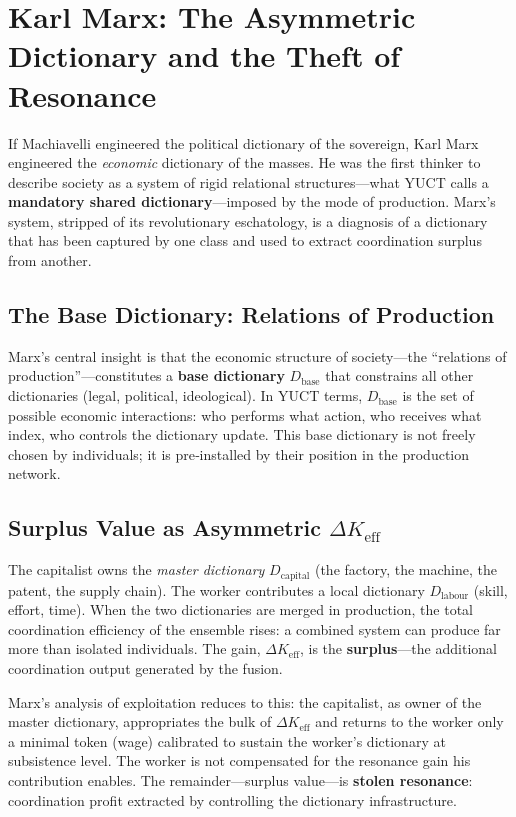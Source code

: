 \documentclass[12pt,a4paper]{article}
\newcommand{\Keff}{K_{\mathrm{eff}}}
\begin{document}
	\section{Karl Marx: The Asymmetric Dictionary and the Theft of Resonance}
	\label{sec:marx}
	
	If Machiavelli engineered the political dictionary of the sovereign, Karl Marx engineered the \emph{economic} dictionary of the masses. He was the first thinker to describe society as a system of rigid relational structures—what YUCT calls a \textbf{mandatory shared dictionary}—imposed by the mode of production. Marx’s system, stripped of its revolutionary eschatology, is a diagnosis of a dictionary that has been captured by one class and used to extract coordination surplus from another.
	
	\subsection{The Base Dictionary: Relations of Production}
	
	Marx’s central insight is that the economic structure of society—the ``relations of production''—constitutes a \textbf{base dictionary} \(D_{\text{base}}\) that constrains all other dictionaries (legal, political, ideological). In YUCT terms, \(D_{\text{base}}\) is the set of possible economic interactions: who performs what action, who receives what index, who controls the dictionary update. This base dictionary is not freely chosen by individuals; it is pre‑installed by their position in the production network.
	
	\subsection{Surplus Value as Asymmetric \(\Delta\Keff\)}
	
	The capitalist owns the \emph{master dictionary} \(D_{\text{capital}}\) (the factory, the machine, the patent, the supply chain). The worker contributes a local dictionary \(D_{\text{labour}}\) (skill, effort, time). When the two dictionaries are merged in production, the total coordination efficiency of the ensemble rises: a combined system can produce far more than isolated individuals. The gain, \(\Delta\Keff\), is the \textbf{surplus}—the additional coordination output generated by the fusion.
	
	Marx’s analysis of exploitation reduces to this: the capitalist, as owner of the master dictionary, appropriates the bulk of \(\Delta\Keff\) and returns to the worker only a minimal token (wage) calibrated to sustain the worker’s dictionary at subsistence level. The worker is not compensated for the resonance gain his contribution enables. The remainder—surplus value—is \textbf{stolen resonance}: coordination profit extracted by controlling the dictionary infrastructure.
	
\end{document}
